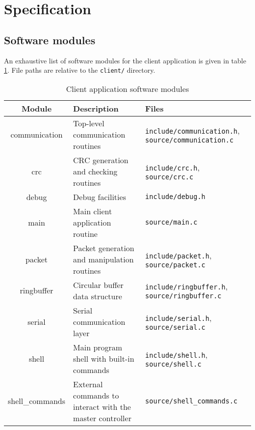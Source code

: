 \section{Specification}

\subsection{Software modules}
An exhaustive list of software modules for the client application is given
in table \ref{tab:client-spec-modules}. File paths are relative to the
\texttt{client/} directory.

\begin{table}[h!]
  \begin{tabularx}{\textwidth}{c X X}
    \toprule
    Module & Description & Files \\
    \midrule
    communication &
      Top-level communication routines &
      \texttt{include/communication.h},
      \texttt{source/communication.c} \\
    crc &
      CRC generation and checking routines &
      \texttt{include/crc.h},
      \texttt{source/crc.c} \\
    debug &
      Debug facilities &
      \texttt{include/debug.h} \\
    main &
      Main client application routine &
      \texttt{source/main.c} \\
    packet &
      Packet generation and manipulation routines &
      \texttt{include/packet.h},
      \texttt{source/packet.c} \\
    ringbuffer &
      Circular buffer data structure &
      \texttt{include/ringbuffer.h},
      \texttt{source/ringbuffer.c} \\
    serial &
      Serial communication layer &
      \texttt{include/serial.h},
      \texttt{source/serial.c} \\
    shell &
      Main program shell with built-in commands &
      \texttt{include/shell.h},
      \texttt{source/shell.c} \\
    shell\_commands &
      External commands to interact with the master controller &
      \texttt{source/shell\_commands.c} \\
    \bottomrule
  \end{tabularx}
  \caption{Client application software modules}
  \label{tab:client-spec-modules}
\end{table}

